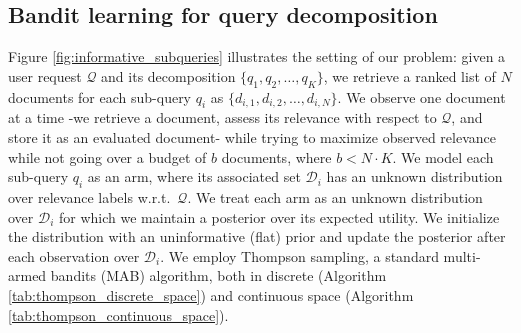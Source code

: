 \subsection{Bandit learning for query decomposition}
Figure \ref{fig:informative_subqueries} illustrates the setting of our problem: given a user request \(\mathcal{Q}\) and its decomposition \(\{q_1, q_2, \ldots, q_K\}\), we retrieve a ranked list of \(N\) documents for each sub-query \(q_i\) as \(\{d_{i, 1}, d_{i, 2}, \ldots, d_{i, N}\}\). We observe one document at a time -we retrieve a document, assess its relevance with respect to \(\mathcal{Q}\), and store it as an evaluated document- while trying to maximize observed relevance while not going over a budget of \(b\) documents, where \(b < N\cdot K\). We model each sub-query \(q_i\) as an arm, where its associated set \(\mathcal{D}_i\) has an unknown distribution over relevance labels w.r.t.\ \(\mathcal{Q}\). We treat each arm as an unknown distribution over \(\mathcal{D}_i\) for which we maintain a posterior over its expected utility. We initialize the distribution with an uninformative (flat) prior and update the posterior after each observation over \(\mathcal{D}_i\). We employ Thompson sampling, a standard multi-armed bandits (MAB) algorithm, both in discrete (Algorithm \ref{tab:thompson_discrete_space}) and continuous space (Algorithm \ref{tab:thompson_continuous_space}). 






    


